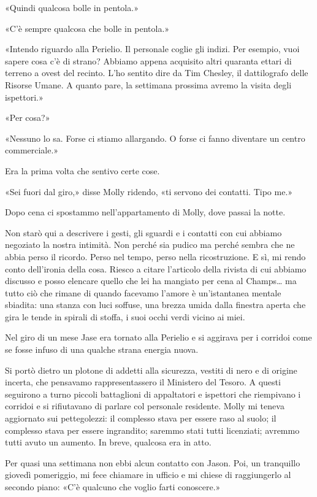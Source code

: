 «Quindi qualcosa bolle in pentola.»

«C'è sempre qualcosa che bolle in pentola.»

«Intendo riguardo alla Perielio. Il personale coglie gli indizi. Per
esempio, vuoi sapere cosa c'è di strano? Abbiamo appena acquisito altri
quaranta ettari di terreno a ovest del recinto. L'ho sentito dire da Tim
Chesley, il dattilografo delle Risorse Umane. A quanto pare, la
settimana prossima avremo la visita degli ispettori.»

«Per cosa?»

«Nessuno lo sa. Forse ci stiamo allargando. O forse ci fanno diventare
un centro commerciale.»

Era la prima volta che sentivo certe cose.

«Sei fuori dal giro,» disse Molly ridendo, «ti servono dei contatti.
Tipo me.»

\separatorefiori

Dopo cena ci spostammo nell'appartamento di Molly, dove passai la notte.

Non starò qui a descrivere i gesti, gli sguardi e i contatti con cui
abbiamo negoziato la nostra intimità. Non perché sia pudico ma perché
sembra che ne abbia perso il ricordo. Perso nel tempo, perso nella
ricostruzione. E sì, mi rendo conto dell'ironia della cosa. Riesco a
citare l'articolo della rivista di cui abbiamo discusso e posso elencare
quello che lei ha mangiato per cena al Champs\ldots{} ma tutto ciò che
rimane di quando facevamo l'amore è un'istantanea mentale sbiadita: una
stanza con luci soffuse, una brezza umida dalla finestra aperta che gira
le tende in spirali di stoffa, i suoi occhi verdi vicino ai miei.

\separatorefiori

Nel giro di un mese Jase era tornato alla Perielio e si aggirava per i
corridoi come se fosse infuso di una qualche strana energia nuova.

Si portò dietro un plotone di addetti alla sicurezza, vestiti di nero e
di origine incerta, che pensavamo rappresentassero il Ministero del
Tesoro. A questi seguirono a turno piccoli battaglioni di appaltatori e
ispettori che riempivano i corridoi e si rifiutavano di parlare col
personale residente. Molly mi teneva aggiornato sui pettegolezzi: il
complesso stava per essere raso al suolo; il complesso stava per essere
ingrandito; saremmo stati tutti licenziati; avremmo tutti avuto un
aumento. In breve, qualcosa era in atto.

Per quasi una settimana non ebbi alcun contatto con Jason. Poi, un
tranquillo giovedì pomeriggio, mi fece chiamare in ufficio e mi chiese
di raggiungerlo al secondo piano: «C'è qualcuno che voglio farti
conoscere.»

